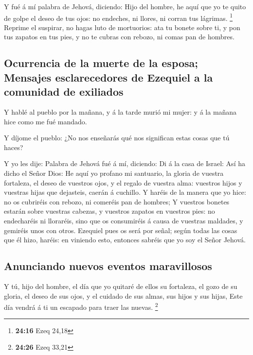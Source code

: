  Y fué á mí palabra de Jehová, diciendo:  Hijo
del hombre, he aquí que yo te quito de golpe el deseo de tus ojos: no
endeches, ni llores, ni corran tus lágrimas. \footnote{\textbf{24:16}
  Ezeq 24,18}  Reprime el suspirar, no hagas luto de
mortuorios: ata tu bonete sobre ti, y pon tus zapatos en tus pies, y no
te cubras con rebozo, ni comas pan de hombres.

\hypertarget{ocurrencia-de-la-muerte-de-la-esposa-mensajes-esclarecedores-de-ezequiel-a-la-comunidad-de-exiliados}{%
\subsection{Ocurrencia de la muerte de la esposa; Mensajes
esclarecedores de Ezequiel a la comunidad de
exiliados}\label{ocurrencia-de-la-muerte-de-la-esposa-mensajes-esclarecedores-de-ezequiel-a-la-comunidad-de-exiliados}}

 Y hablé al pueblo por la mañana, y á la tarde murió mi
mujer: y á la mañana hice como me fué mandado.

 Y díjome el pueblo: ¿No nos enseñarás qué nos significan
estas cosas que tú haces?

 Y yo les dije: Palabra de Jehová fué á mí, diciendo:
 Di á la casa de Israel: Así ha dicho el Señor Dios: He
aquí yo profano mi santuario, la gloria de vuestra fortaleza, el deseo
de vuestros ojos, y el regalo de vuestra alma: vuestros hijos y vuestras
hijas que dejasteis, caerán á cuchillo.  Y haréis de la
manera que yo hice: no os cubriréis con rebozo, ni comeréis pan de
hombres;  Y vuestros bonetes estarán sobre vuestras
cabezas, y vuestros zapatos en vuestros pies: no endecharéis ni
lloraréis, sino que os consumiréis á causa de vuestras maldades, y
gemiréis unos con otros.  Ezequiel pues os será por señal;
según todas las cosas que él hizo, haréis: en viniendo esto, entonces
sabréis que yo soy el Señor Jehová.

\hypertarget{anunciando-nuevos-eventos-maravillosos}{%
\subsection{Anunciando nuevos eventos
maravillosos}\label{anunciando-nuevos-eventos-maravillosos}}

 Y tú, hijo del hombre, el día que yo quitaré de ellos su
fortaleza, el gozo de su gloria, el deseo de sus ojos, y el cuidado de
sus almas, sus hijos y sus hijas,  Este día vendrá á ti un
escapado para traer las nuevas. \footnote{\textbf{24:26} Ezeq 33,21}


